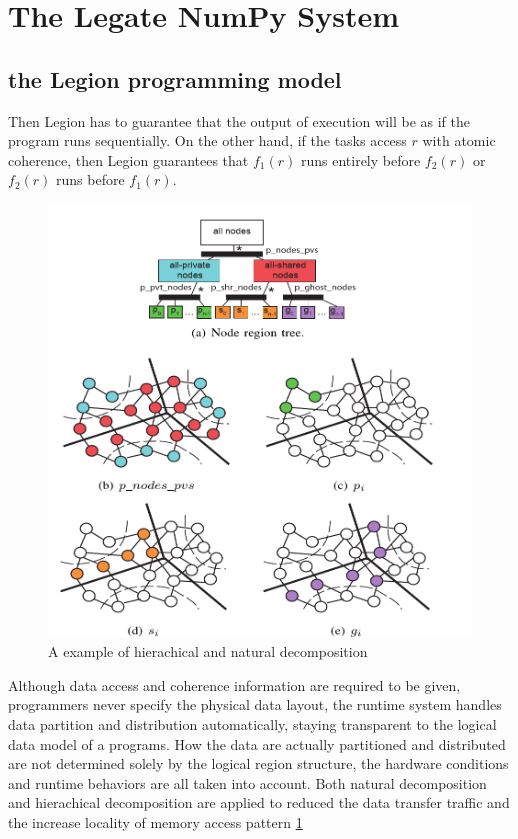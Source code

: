 \documentclass{article}
\newenvironment{newSec}[1]{
	\section{#1}
	\lhead{#1}
}{ \newpage }
\newenvironment{newSubsec}[1]{
	\subsection{#1}
}{}
\begin{document}
\begin{newSec}{The Legate NumPy System}
\begin{newSubsec}{the Legion programming model}
		Then Legion has to guarantee that the output of execution will be as if the program runs sequentially.
		On the other hand, if the tasks access $r$ with atomic coherence, then Legion guarantees that $f_1(r)$ runs
		entirely before  $f_2(r)$ or $f_2(r)$ runs before $f_1(r)$.\\
		\begin{figure}[htbp]
			\centering
			\includegraphics[scale=0.7]{fig/legion-partition.png}
			\caption{{A example of hierachical and natural decomposition}\cite{Legion}}
			\label{fig:region-tree}
		\end{figure}
		Although data access and coherence information are required to be given, programmers never specify the physical data layout, the runtime system handles data partition and distribution automatically, staying transparent to the logical data model of a programs.
		How the data are actually partitioned and distributed are not determined solely by the logical region structure,
		the hardware conditions and runtime behaviors are all taken into account.
		Both natural decomposition and hierachical decomposition are applied to reduced the data transfer traffic and the increase locality of memory access pattern \ref{fig:region-tree}

\end{newSubsec}
\end{newSec}
\end{document}
